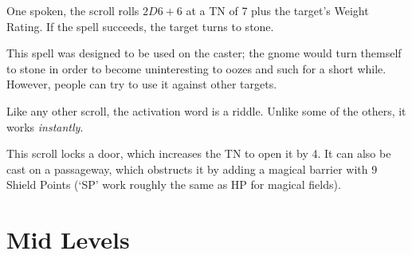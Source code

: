 \begin{multicols}{2}
\begin{itemize}
\end{itemize}

One spoken, the scroll rolls $2D6+6$ at a TN of 7 plus the target's Weight Rating.
If the spell succeeds, the target turns to stone.

This spell was designed to be used on the caster; the gnome would turn themself to stone in order to become uninteresting to oozes and such for a short while.
However, people can try to use it against other targets.

Like any other scroll, the activation word is a riddle.
Unlike some of the others, it works \emph{instantly}.


This scroll locks a door, which increases the TN to open it by 4.
It can also be cast on a passageway, which obstructs it by adding a magical barrier with 9 Shield Points (`SP' work roughly the same as HP for magical fields).

\end{multicols}

\section{Mid Levels}


